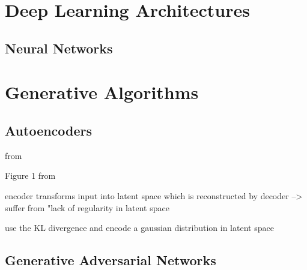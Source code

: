 \section{Deep Learning Architectures}
\label{ch:preliminaries-deepLearningArchitectures}

\subsection{Neural Networks}
\label{ch:preliminaries-deepLearningArchitectures-neuralNetworks}


\section{Generative Algorithms}
\label{ch:preliminaries-generativeAlgorithms}

\subsection{Autoencoders}
\label{ch:preliminaries-generativeAlgorithms-variationalAutoencoders}

from \cite{kingma2013AutoEncodingVariationalBayes}

Figure 1 from \cite{razghandi2022VariationalAutoencoderGenerativea}

encoder transforms input into latent space which is reconstructed by decoder \cite{razghandi2022VariationalAutoencoderGenerativea}
--> suffer from "lack of regularity in latent space \cite{razghandi2022VariationalAutoencoderGenerativea}

use the KL divergence and encode a gaussian distribution in latent space \cite{razghandi2022VariationalAutoencoderGenerativea}


\subsection{Generative Adversarial Networks}
\label{ch:preliminaries-generativeAlgorithms-generativeAdversarialNetworks}

